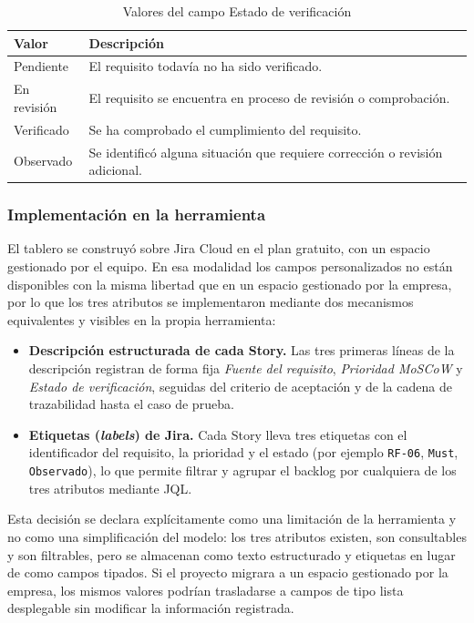 \documentclass[journal,onecolumn]{IEEEtran}
\begin{document}
	\begin{table}[H]
		\centering
		\caption{Valores del campo Estado de verificación}
		\label{tab:estado-verif}
		\begin{tabular}{L{2.6cm} L{10.1cm}}
			\toprule
			\textbf{Valor} & \textbf{Descripción} \\
			\midrule
			Pendiente   & El requisito todavía no ha sido verificado. \\
			En revisión & El requisito se encuentra en proceso de revisión o comprobación. \\
			Verificado  & Se ha comprobado el cumplimiento del requisito. \\
			Observado   & Se identificó alguna situación que requiere corrección o revisión
			adicional. \\
			\bottomrule
		\end{tabular}
	\end{table}
	
	\subsubsection{Implementación en la herramienta}
	
	El tablero se construyó sobre Jira Cloud en el plan gratuito, con un espacio gestionado por el
	equipo. En esa modalidad los campos personalizados no están disponibles con la misma libertad que
	en un espacio gestionado por la empresa, por lo que los tres atributos se implementaron mediante
	dos mecanismos equivalentes y visibles en la propia herramienta:
	
	\begin{itemize}[leftmargin=1.4em, itemsep=2pt, topsep=3pt]
		\item \textbf{Descripción estructurada de cada Story.} Las tres primeras líneas de la
		descripción registran de forma fija \emph{Fuente del requisito}, \emph{Prioridad MoSCoW} y
		\emph{Estado de verificación}, seguidas del criterio de aceptación y de la cadena de
		trazabilidad hasta el caso de prueba.
		\item \textbf{Etiquetas (\emph{labels}) de Jira.} Cada Story lleva tres etiquetas con el
		identificador del requisito, la prioridad y el estado (por ejemplo \texttt{RF-06},
		\texttt{Must}, \texttt{Observado}), lo que permite filtrar y agrupar el backlog por cualquiera
		de los tres atributos mediante JQL.
	\end{itemize}
	
	Esta decisión se declara explícitamente como una limitación de la herramienta y no como una
	simplificación del modelo: los tres atributos existen, son consultables y son filtrables, pero se
	almacenan como texto estructurado y etiquetas en lugar de como campos tipados. Si el proyecto
	migrara a un espacio gestionado por la empresa, los mismos valores podrían trasladarse a campos de
	tipo lista desplegable sin modificar la información registrada.
	
\end{document}

